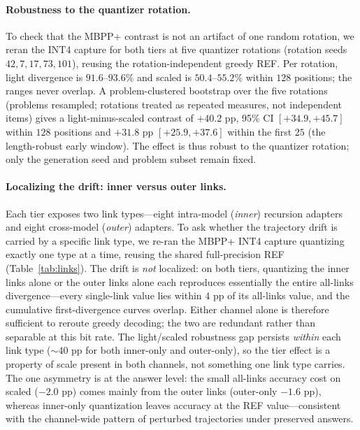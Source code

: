 \documentclass{article}
\begin{document}
\paragraph{Robustness to the quantizer rotation.}
To check that the MBPP+ contrast is not an artifact of one random rotation, we reran the
INT4 capture for both tiers at five quantizer rotations (rotation seeds $42,7,17,73,101$),
reusing the rotation-independent greedy REF. Per rotation, light divergence is
$91.6$--$93.6\%$ and scaled is $50.4$--$55.2\%$ within $128$ positions; the ranges never
overlap. A problem-clustered bootstrap over the five rotations (problems resampled;
rotations treated as repeated measures, not independent items) gives a light-minus-scaled
contrast of $+40.2$ pp, 95\% CI $[+34.9,+45.7]$ within $128$ positions and $+31.8$ pp
$[+25.9,+37.6]$ within the first $25$ (the length-robust early window). The effect is thus
robust to the quantizer rotation; only the generation seed and problem subset remain fixed.

\paragraph{Localizing the drift: inner versus outer links.}
Each tier exposes two link types---eight intra-model (\emph{inner}) recursion adapters and
eight cross-model (\emph{outer}) adapters. To ask whether the trajectory drift is carried by a
specific link type, we re-ran the MBPP+ INT4 capture quantizing exactly one type at a time,
reusing the shared full-precision REF (Table~\ref{tab:links}). The drift is \emph{not}
localized: on both tiers, quantizing the inner links alone or the outer links alone each
reproduces essentially the entire all-links divergence---every single-link value lies within
$4$ pp of its all-links value, and the cumulative first-divergence curves overlap. Either
channel alone is therefore sufficient to reroute greedy decoding; the two are redundant rather
than separable at this bit rate. The light/scaled robustness gap persists \emph{within} each
link type ($\sim$40 pp for both inner-only and outer-only), so the tier effect is a property of
scale present in both channels, not something one link type carries. The one asymmetry is at
the answer level: the small all-links accuracy cost on scaled ($-2.0$ pp) comes mainly from the
outer links (outer-only $-1.6$ pp), whereas inner-only quantization leaves accuracy at the REF
value---consistent with the channel-wide pattern of perturbed trajectories under preserved
answers.
\end{document}
